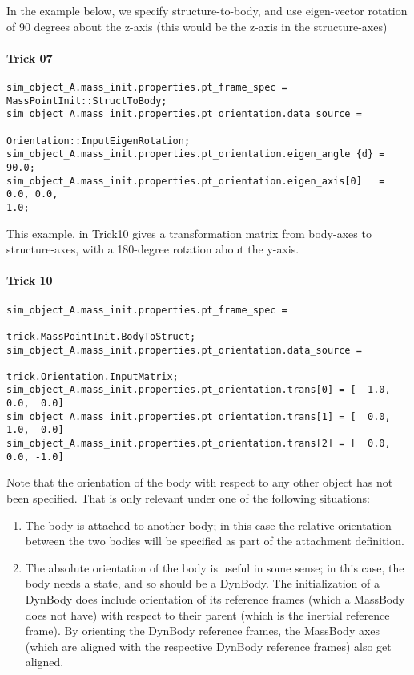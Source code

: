 In the example below, we specify structure-to-body, and use eigen-vector
rotation of 90 degrees about the z-axis (this would be the z-axis in the
structure-axes)

\paragraph{Trick 07}

  \begin{verbatim}
sim_object_A.mass_init.properties.pt_frame_spec =
MassPointInit::StructToBody;
sim_object_A.mass_init.properties.pt_orientation.data_source =
                                        Orientation::InputEigenRotation;
sim_object_A.mass_init.properties.pt_orientation.eigen_angle {d} = 90.0;
sim_object_A.mass_init.properties.pt_orientation.eigen_axis[0]   = 0.0, 0.0,
1.0;
\end{verbatim}

This example, in Trick10 gives a transformation matrix from body-axes to
structure-axes, with a 180-degree rotation about the y-axis.
\paragraph{Trick 10}

  \begin{verbatim}
sim_object_A.mass_init.properties.pt_frame_spec =
                                         trick.MassPointInit.BodyToStruct;
sim_object_A.mass_init.properties.pt_orientation.data_source =
                                                 trick.Orientation.InputMatrix;
sim_object_A.mass_init.properties.pt_orientation.trans[0] = [ -1.0,  0.0,  0.0]
sim_object_A.mass_init.properties.pt_orientation.trans[1] = [  0.0,  1.0,  0.0]
sim_object_A.mass_init.properties.pt_orientation.trans[2] = [  0.0,  0.0, -1.0]
\end{verbatim}

Note that the orientation of the body with respect to any other object has not
been specified.  That is only relevant under one of the following situations:
\begin{enumerate}
 \item The body is attached to another body; in this case the relative
 orientation between the two bodies will be specified as part of the
 attachment definition.
 \item The absolute orientation of the body is useful in some sense; in this
 case, the body needs a state, and so should be a DynBody.  The initialization
 of a DynBody does include orientation of its reference frames (which a
 MassBody does not have) with respect to their parent (which is the inertial
 reference frame).  By orienting the DynBody reference frames, the MassBody
 axes (which are aligned with the respective DynBody reference frames) also
 get aligned.
\end{enumerate}

